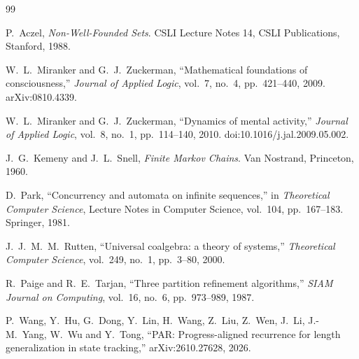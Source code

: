 \documentclass[11pt, a4paper]{article}
\theoremstyle{plain}
\theoremstyle{definition}
\theoremstyle{remark}
\begin{document}
\begin{thebibliography}{99}

P.~Aczel,
\newblock \emph{Non-Well-Founded Sets}.
\newblock CSLI Lecture Notes 14, CSLI Publications, Stanford, 1988.

W.~L.~Miranker and G.~J.~Zuckerman,
\newblock ``Mathematical foundations of consciousness,''
\newblock \emph{Journal of Applied Logic}, vol.~7, no.~4, pp.~421--440, 2009.
\newblock arXiv:0810.4339.

W.~L.~Miranker and G.~J.~Zuckerman,
\newblock ``Dynamics of mental activity,''
\newblock \emph{Journal of Applied Logic}, vol.~8, no.~1, pp.~114--140, 2010.
\newblock doi:10.1016/j.jal.2009.05.002.

J.~G.~Kemeny and J.~L.~Snell,
\newblock \emph{Finite Markov Chains}.
\newblock Van Nostrand, Princeton, 1960.

D.~Park,
\newblock ``Concurrency and automata on infinite sequences,''
\newblock in \emph{Theoretical Computer Science}, Lecture Notes in Computer Science, vol.~104, pp.~167--183.
\newblock Springer, 1981.

J.~J.~M.~M.~Rutten,
\newblock ``Universal coalgebra: a theory of systems,''
\newblock \emph{Theoretical Computer Science}, vol.~249, no.~1, pp.~3--80, 2000.

R.~Paige and R.~E.~Tarjan,
\newblock ``Three partition refinement algorithms,''
\newblock \emph{SIAM Journal on Computing}, vol.~16, no.~6, pp.~973--989, 1987.

P.~Wang, Y.~Hu, G.~Dong, Y.~Lin, H.~Wang, Z.~Liu, Z.~Wen, J.~Li, J.-M.~Yang, W.~Wu and Y.~Tong,
\newblock ``PAR: Progress-aligned recurrence for length generalization in state tracking,''
\newblock arXiv:2610.27628, 2026.

\end{thebibliography}
\end{document}
